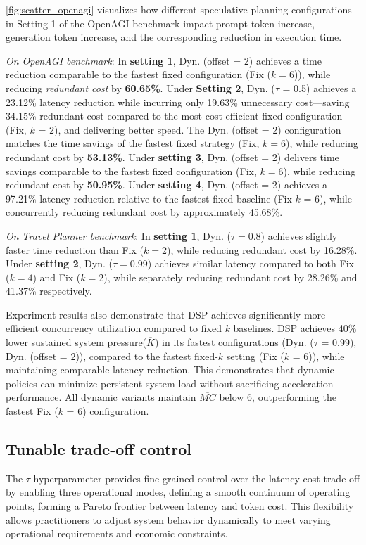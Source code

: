 \cref{fig:scatter_openagi} visualizes how different speculative planning configurations in Setting 1 of the OpenAGI benchmark impact prompt token increase, generation token increase, and the corresponding reduction in execution time.

\emph{On OpenAGI benchmark}: 
In \textbf{setting 1}, Dyn. (offset = 2) achieves a time reduction comparable to the fastest fixed configuration (Fix ($k = 6$)), while reducing \emph{redundant cost} by \textbf{60.65\%}.
Under \textbf{Setting 2}, Dyn. ($\tau$ = 0.5) achieves a 23.12\% latency reduction while incurring only 19.63\% unnecessary cost—saving 34.15\% redundant cost compared to the most cost-efficient fixed configuration (Fix, $k$ = 2), and delivering better speed. The Dyn. (offset = 2) configuration matches the time savings of the fastest fixed strategy (Fix, $k = 6$), while reducing redundant cost by \textbf{53.13\%}.
Under \textbf{setting 3}, Dyn. (offset = 2) delivers time savings comparable to the fastest fixed configuration (Fix, $k = 6$), while reducing redundant cost by \textbf{50.95\%}. 
Under \textbf{setting 4}, Dyn. (offset = 2) achieves a 97.21\% latency reduction relative to the fastest fixed baseline (Fix $k$ = 6), while concurrently reducing redundant cost by approximately 45.68\%.

\emph{On Travel Planner benchmark}: 
In \textbf{setting 1}, Dyn. ($\tau = 0.8$) achieves slightly faster time reduction than Fix ($k = 2$), while reducing redundant cost by 16.28\%.
Under \textbf{setting 2}, Dyn. ($\tau = 0.99$) achieves similar latency compared to both Fix ($k = 4$) and Fix ($k = 2$), while separately reducing redundant cost by 28.26\% and 41.37\% respectively.

Experiment results also demonstrate that DSP achieves significantly more efficient concurrency utilization compared to fixed $k$ baselines.
DSP achieves 40\% lower sustained system pressure($\overline{K}$) in its fastest configurations (Dyn. ($\tau$ = 0.99), Dyn. (offset = 2)), compared to the fastest fixed-$k$ setting (Fix ($k$ = 6)), while maintaining comparable latency reduction. This demonstrates that dynamic policies can minimize persistent system load without sacrificing acceleration performance.
All dynamic variants maintain $\overline{MC}$ below 6, outperforming the fastest Fix ($k$ = 6) configuration.



\subsection{Tunable trade-off control}
The $\tau$ hyperparameter provides fine-grained control over the latency-cost trade-off by enabling three operational modes, defining a smooth continuum of operating points, forming a Pareto frontier between latency and token cost.  This flexibility allows practitioners to adjust system behavior dynamically to meet varying operational requirements and economic constraints.

